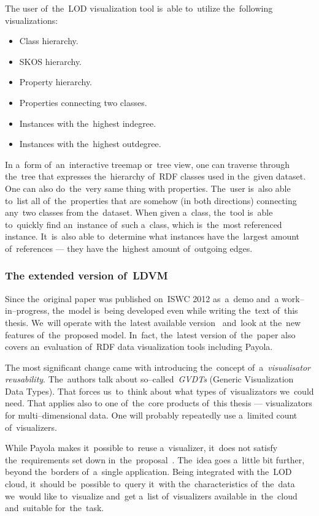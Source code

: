 The user of~the~LOD visualization tool is~able to~utilize the~following 
visualizations:

\begin{itemize}
\item Class hierarchy.
\item SKOS hierarchy.
\item Property hierarchy.
\item Properties connecting two classes.
\item Instances with the~highest indegree.
\item Instances with the~highest outdegree.
\end{itemize}

In a~form of~an~interactive treemap or~tree view, one 
can traverse through the~tree that expresses the~hierarchy of~RDF classes used 
in the~given dataset. One can also do~the~very same thing with properties. The~user is~also able to~list all of~the~properties that are somehow (in both directions)
connecting any~two classes from the~dataset. When given a~class, the~tool is~able to~quickly find an~instance of~such a~class, which is~the~most referenced
instance. It~is~also able to~determine what instances have the~largest amount of~references
--- they have the~highest amount of~outgoing
edges.

\subsubsection{The extended version of~LDVM}
Since the~original paper was published on~ISWC 2012 as~a~demo and~a
work--in--progress, the~model is~being developed even while writing the~text of~this thesis. We~will operate with the~latest available version~\cite{ldvm2} and~look 
at the~new features of~the~proposed model. In~fact, the~latest version of~the~paper also covers an~evaluation of~RDF data visualization tools including 
Payola.

The most significant change came with introducing the~concept of~a~\emph{visualisator 
reusability}. The~authors talk about so--called~\emph{GVDTs} (Generic Visualization Data Types).
That forces us~to~think about what types of~visualizators we~could need. That applies also to
one of~the~core products of~this thesis --- visualizators for multi--dimensional data.
One will probably repeatedly use a~limited count of~visualizers.

While Payola makes it~possible to~reuse a~visualizer, it~does not satisfy the~requirements set down in~the~proposal~\cite{ldvm2}. The~idea goes a~little bit 
further, beyond the~borders of~a~single application. Being integrated with the~LOD cloud, it~should be~possible to~query it~with the~characteristics of~the~data we~would like to~visualize and~get a~list of~visualizers 
available in~the~cloud and~suitable for~the~task.

